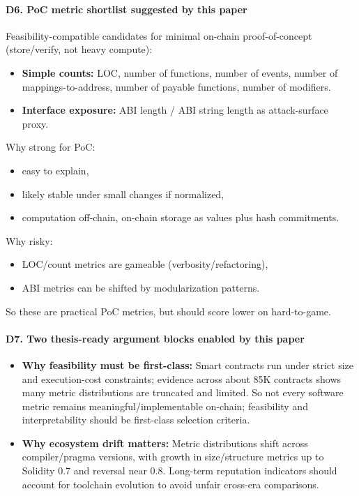 \documentclass[11pt,a4paper]{article}
\begin{document}
\paragraph{D6. PoC metric shortlist suggested by this paper}
Feasibility-compatible candidates for minimal on-chain proof-of-concept (store/verify, not heavy compute):
\begin{itemize}[leftmargin=*]
  \item \textbf{Simple counts:} LOC, number of functions, number of events, number of mappings-to-address, number of payable functions, number of modifiers.
  \item \textbf{Interface exposure:} ABI length / ABI string length as attack-surface proxy.
\end{itemize}

Why strong for PoC:
\begin{itemize}[leftmargin=*]
  \item easy to explain,
  \item likely stable under small changes if normalized,
  \item computation off-chain, on-chain storage as values plus hash commitments.
\end{itemize}

Why risky:
\begin{itemize}[leftmargin=*]
  \item LOC/count metrics are gameable (verbosity/refactoring),
  \item ABI metrics can be shifted by modularization patterns.
\end{itemize}
So these are practical PoC metrics, but should score lower on hard-to-game.

\paragraph{D7. Two thesis-ready argument blocks enabled by this paper}
\begin{itemize}[leftmargin=*]
  \item \textbf{Why feasibility must be first-class:}
  Smart contracts run under strict size and execution-cost constraints; evidence across about 85K contracts shows many metric distributions are truncated and limited. So not every software metric remains meaningful/implementable on-chain; feasibility and interpretability should be first-class selection criteria.
  \item \textbf{Why ecosystem drift matters:}
  Metric distributions shift across compiler/pragma versions, with growth in size/structure metrics up to Solidity 0.7 and reversal near 0.8. Long-term reputation indicators should account for toolchain evolution to avoid unfair cross-era comparisons.
\end{itemize}
\end{document}
